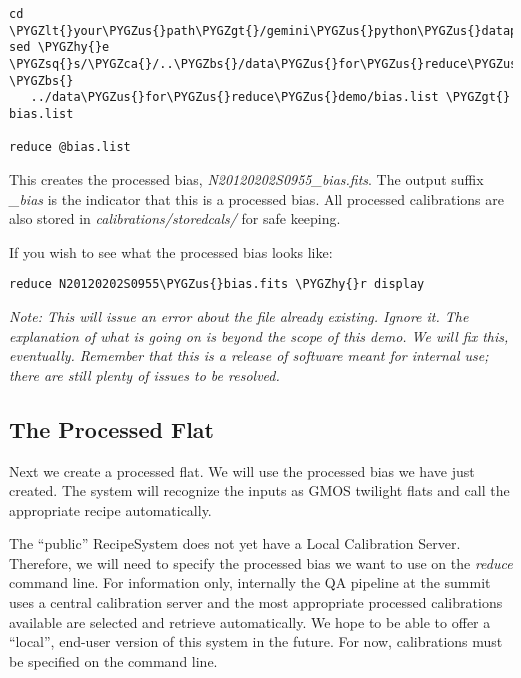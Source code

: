 \documentclass[letterpaper,10pt,english]{sphinxmanual}
\def\PYGZbs{\char`\\}
\def\PYGZus{\char`\_}
\def\PYGZca{\char`\^}
\def\PYGZlt{\char`\<}
\def\PYGZgt{\char`\>}
\def\PYGZhy{\char`\-}
\def\PYGZsq{\char`\'}
\begin{document}
\begin{Verbatim}[commandchars=\\\{\}]
cd \PYGZlt{}your\PYGZus{}path\PYGZgt{}/gemini\PYGZus{}python\PYGZus{}datapkg\PYGZhy{}X1/playground
sed \PYGZhy{}e \PYGZsq{}s/\PYGZca{}/..\PYGZbs{}/data\PYGZus{}for\PYGZus{}reduce\PYGZus{}demo\PYGZbs{}//g\PYGZsq{} \PYGZbs{}
   ../data\PYGZus{}for\PYGZus{}reduce\PYGZus{}demo/bias.list \PYGZgt{} bias.list

reduce @bias.list
\end{Verbatim}

This creates the processed bias, \emph{N20120202S0955\_bias.fits}.  The output suffix
\emph{\_bias} is the indicator that this is a processed bias.  All processed calibrations
are also stored in \emph{calibrations/storedcals/} for safe keeping.

If you wish to see what the processed bias looks like:

\begin{Verbatim}[commandchars=\\\{\}]
reduce N20120202S0955\PYGZus{}bias.fits \PYGZhy{}r display
\end{Verbatim}

\emph{Note: This will issue an error about the file already existing.  Ignore it.
The explanation of what is going on is beyond the scope of this demo.  We
will fix this, eventually.  Remember that this is a release of software meant
for internal use; there are still plenty of issues to be resolved.}


\subsection{The Processed Flat}
\label{appendices/appendix_demo:the-processed-flat}
Next we create a processed flat.  We will use the processed bias we have
just created.  The system will recognize the inputs as GMOS twilight flats and
call the appropriate recipe automatically.

The ``public'' RecipeSystem does not yet have a Local Calibration Server.  Therefore,
we will need to specify the processed bias we want to use on the \emph{reduce} command
line.  For information only, internally the QA pipeline at the summit uses a
central calibration server and the most appropriate processed calibrations available
are selected and retrieve automatically.  We hope to be able to offer a ``local'',
end-user version of this system in the future.  For now, calibrations must be
specified on the command line.
\end{document}
